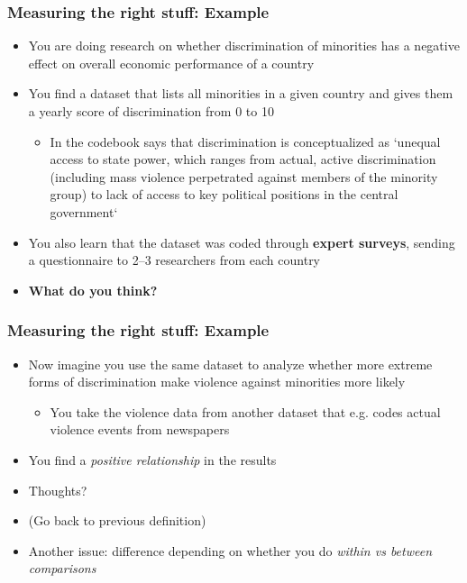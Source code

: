 \documentclass[aspectratio=43]{beamer}
\begin{document}
\begin{frame}
\frametitle{Measuring the right stuff: Example}
\centering

\begin{itemize}
  \item You are doing research on whether discrimination of minorities has a negative effect on overall economic performance of a country
  \item<2-> You find a dataset that lists all minorities in a given country and gives them a yearly score of discrimination from 0 to 10
  \begin{itemize}
    \item In the codebook says that discrimination is conceptualized as `unequal access to state power, which ranges from actual, active discrimination (including mass violence perpetrated against members of the minority group) to lack of access to key political positions in the central government`
  \end{itemize}
  \item<3-> You also learn that the dataset was coded through \textbf{expert surveys}, sending a questionnaire to 2--3 researchers from each country
  \item<4-> \textbf{What do you think?}
\end{itemize}

\end{frame}

\begin{frame}
\frametitle{Measuring the right stuff: Example}
\centering

\begin{itemize}
  \item Now imagine you use the same dataset to analyze whether more extreme forms of discrimination make violence against minorities more likely
  \begin{itemize}
    \item You take the violence data from another dataset that e.g. codes actual violence events from newspapers
  \end{itemize}
  \item You find a \textit{positive relationship} in the results
  \item Thoughts?
  \item<2-> (Go back to previous definition)
  \item<3-> Another issue: difference depending on whether you do \textit{within vs between comparisons}
\end{itemize}

\end{frame}
\end{document}
